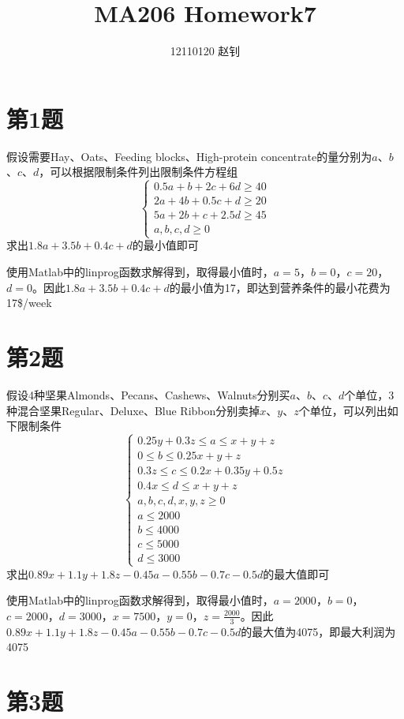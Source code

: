 \documentclass{article}
\title{MA206 Homework7}
\author{12110120 赵钊}
\date{}
\begin{document}
\maketitle


\section{第1题}
假设需要Hay、Oats、Feeding blocks、High-protein concentrate的量分别为$a$、$b$、$c$、$d$，可以根据限制条件列出限制条件方程组
\[\begin{cases}
0.5a+b+2c+6d \geq 40
\\
2a+4b+0.5c+d  \geq 20
\\
5a+2b+c+2.5d \geq 45
\\
a,b,c,d \geq 0
\end{cases} \]
求出$1.8a+3.5b+0.4c+d$的最小值即可

使用Matlab中的linprog函数求解得到，取得最小值时，$a=5$，$b=0$，$c=20$，$d=0$。因此$1.8a+3.5b+0.4c+d$的最小值为17，即达到营养条件的最小花费为17\$/week


\section{第2题}
假设4种坚果Almonds、Pecans、Cashews、Walnuts分别买$a$、$b$、$c$、$d$个单位，3种混合坚果Regular、Deluxe、Blue Ribbon分别卖掉$x$、$y$、$z$个单位，可以列出如下限制条件
\[\begin{cases}
0.25y+0.3z \leq a \leq x+y+z
\\
0 \leq b  \leq 0.25x+y+z
\\
0.3z  \leq c  \leq 0.2x+0.35y+0.5z
\\
0.4x \leq d \leq x+y+z
\\
a,b,c,d,x,y,z  \geq 0
\\
a \leq 2000
\\
b  \leq 4000
\\
c  \leq 5000
\\
d \leq 3000
\end{cases} \]
求出$0.89x+1.1y+1.8z-0.45a-0.55b-0.7c-0.5d$的最大值即可

使用Matlab中的linprog函数求解得到，取得最小值时，$a=2000$，$b=0$，$c=2000$，$d=3000$，$x=7500$，$y=0$，$z=\frac{2000}{3}$。因此$0.89x+1.1y+1.8z-0.45a-0.55b-0.7c-0.5d$的最大值为4075，即最大利润为4075


\section{第3题}
\end{document}
